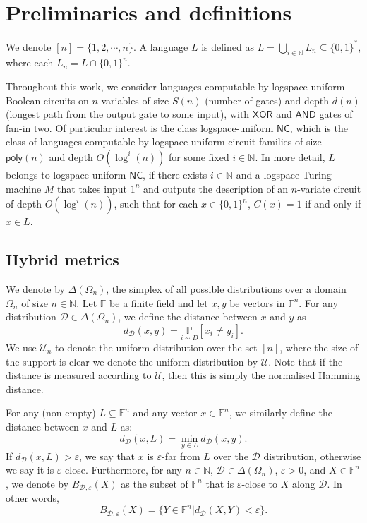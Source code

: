 \documentclass[10pt,a4paper]{article}
\newcommand{\poly}{\mathsf{poly}}
\newcommand{\NC}{\mathsf{NC}}
\newcommand{\F}{\mathbb{F}}
\newcommand{\N}{\mathbb{N}}
\newcommand{\sU}{\mathcal{U}}
\newcommand{\sD}{\mathcal{D}}
\begin{document}
\section{Preliminaries and definitions}

We denote $[n]=\{1,2,\cdots, n\}$. A language $L$ is defined as $L=\bigcup_{i\in \mathbb{N}}L_{n} \subseteq \{0,1\}^*$, where each $L_n = L \cap \{0,1\}^n$.

Throughout this work, we consider languages computable by logspace-uniform Boolean circuits on $n$ variables of size $S(n)$ (number of gates) and depth $d(n)$ (longest path from the output gate to some input), with $\mathsf{XOR}$ and $\mathsf{AND}$ gates of fan-in two. Of particular interest is the class logspace-uniform $\NC$, which is the class of languages computable by logspace-uniform circuit families of size $\poly(n)$ and depth $O(\log^i (n))$ for some fixed $i\in \N$. In more detail, $L$ belongs to logspace-uniform $\NC$, if there exists $i\in \N$ and a logspace Turing machine $M$ that takes input $1^n$ and outputs the description of an $n$-variate circuit of depth $O(\log^i (n))$, such that for each $x \in \{0,1\}^n$, $C(x) = 1$ if and only if $x \in L$. 

\subsection{Hybrid metrics}
We denote by $\Delta(\Omega_{n})$, the simplex of all possible distributions over a domain $\Omega_{n}$ of size $n\in \mathbb{N}$. Let $\mathbb{F}$ be a finite field and let $x,y$ be vectors in $\mathbb{F}^n$. For any distribution $\mathcal{D}\in \Delta(\Omega_n)$, we define the distance between $x$ and $y$ as
\begin{equation*}
d_{\mathcal{D}}(x,y)=\underset{i\sim D}{\mathbb{P}}\left[x_{i}\neq y_{i}\right].
\end{equation*}
We use $\mathcal{U}_{n}$ to denote the uniform distribution over the set $[n]$, where the size of the support is clear we denote the uniform distribution by $\mathcal{U}$. Note that if the distance is measured according to $\sU$, then this is simply the normalised Hamming distance. 

For any (non-empty) $L\subseteq \mathbb{F}^{n}$ and any vector $x \in \mathbb{F}^{n}$, we similarly define the distance between $x$ and $L$ as:
\begin{equation*}
d_{\mathcal{D}}(x,L)=\min\limits_{y\in L}d_{\mathcal{D}}(x,y).
\end{equation*}
If $d_{\mathcal{D}}(x,L)>\varepsilon$, we say that $x$ is $\varepsilon$-far from $L$ over the $\mathcal{D}$ distribution, otherwise we say it is $\varepsilon$-close. Furthermore, for any $n\in \N$, $\sD\in\Delta(\Omega_{n})$, $\varepsilon>0$, and $X\in \F^{n}$, we denote by $B_{\mathcal{D},\varepsilon}(X)$ as the subset of $\F^n$ that is $\varepsilon$-close to $X$ along $\sD$. In other words,
\begin{equation}
    B_{\sD,\varepsilon}(X)=\{Y\in \F^{n}\vert d_{\sD}(X,Y)<\varepsilon\}.
\end{equation}
\end{document}
